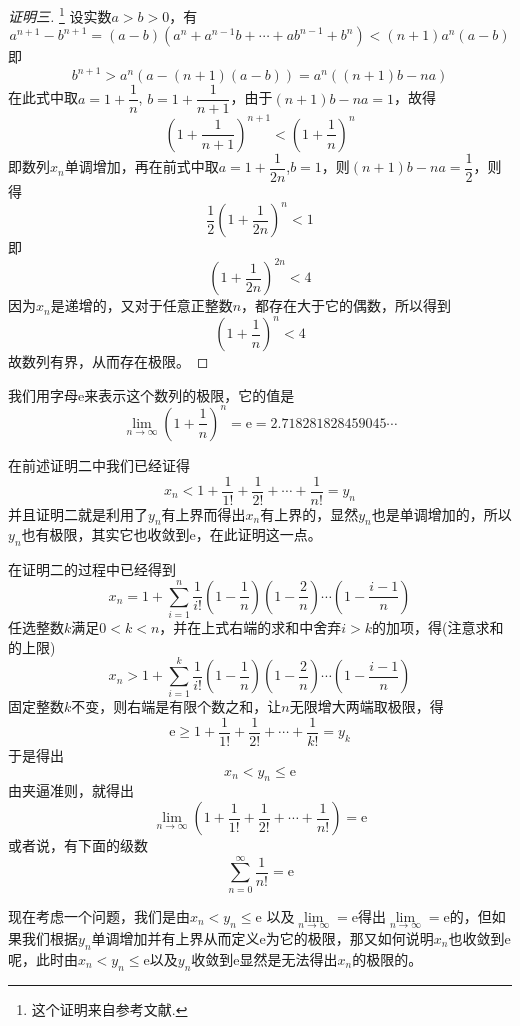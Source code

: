 \begin{proof}[证明三]\footnote{这个证明来自参考文献\cite{math-analysis}.}
  设实数$a>b>0$，有
  \[ a^{n+1}-b^{n+1}=(a-b)(a^n+a^{n-1}b+\cdots+ab^{n-1}+b^n) < (n+1)a^n(a-b) \]
  即
  \begin{equation}
    \label{eq:example-equation-a-n-b-n}
   b^{n+1}>a^n(a-(n+1)(a-b))=a^n((n+1)b-na) 
  \end{equation}
  在此式中取$a=1+\dfrac{1}{n}$, $b=1+\dfrac{1}{n+1}$，由于$(n+1)b-na=1$，故得
  \[ \left( 1+\frac{1}{n+1} \right)^{n+1} < \left( 1+\frac{1}{n} \right)^n \]
  即数列$x_n$单调增加，再在前式中取$a=1+\dfrac{1}{2n}$,$b=1$，则$(n+1)b-na=\dfrac{1}{2}$，则得
  \[ \frac{1}{2} \left( 1 + \frac{1}{2n} \right)^n < 1 \]
  即
  \[ \left( 1 + \frac{1}{2n} \right)^{2n} < 4 \]
  因为$x_n$是递增的，又对于任意正整数$n$，都存在大于它的偶数，所以得到
  \[ \left( 1 + \frac{1}{n} \right)^n < 4 \]
  故数列有界，从而存在极限。
\end{proof}

我们用字母$\mathrm{e}$来表示这个数列的极限，它的值是
\[ \lim_{n \to \infty} \left( 1+\frac{1}{n} \right)^n = \mathrm{e}= 2.718281828459045\cdots \]

在前述证明二中我们已经证得
\[ x_n < 1 + \frac{1}{1!} + \frac{1}{2!} + \cdots + \frac{1}{n!} = y_n \]
并且证明二就是利用了$y_n$有上界而得出$x_n$有上界的，显然$y_n$也是单调增加的，所以$y_n$也有极限，其实它也收敛到$\mathrm{e}$，在此证明这一点。

在证明二的过程中已经得到
\[ x_n = 1 + \sum_{i=1}^n \frac{1}{i!}\left( 1-\frac{1}{n} \right) \left( 1-\frac{2}{n} \right) \cdots \left( 1-\frac{i-1}{n} \right) \]
任选整数$k$满足$0<k<n$，并在上式右端的求和中舍弃$i>k$的加项，得(注意求和的上限)
\[ x_n > 1 + \sum_{i=1}^k \frac{1}{i!}\left( 1-\frac{1}{n} \right) \left( 1-\frac{2}{n} \right) \cdots \left( 1-\frac{i-1}{n} \right) \]
固定整数$k$不变，则右端是有限个数之和，让$n$无限增大两端取极限，得
\[ \mathrm{e} \geqslant 1 + \frac{1}{1!} + \frac{1}{2!} + \cdots + \frac{1}{k!} = y_k \]
于是得出
\[ x_n < y_n \leqslant \mathrm{e} \]
由夹逼准则，就得出
\[ \lim_{n \to \infty} \left( 1 + \frac{1}{1!} + \frac{1}{2!} + \cdots + \frac{1}{n!} \right) = \mathrm{e} \]
或者说，有下面的级数
\[ \sum_{n=0}^{\infty} \frac{1}{n!} = \mathrm{e} \]

现在考虑一个问题，我们是由$x_n<y_n \leqslant \mathrm{e}$ 以及$\lim\limits_{n \to \infty} = \mathrm{e}$得出$\lim\limits_{n \to \infty}=\mathrm{e}$的，但如果我们根据$y_n$单调增加并有上界从而定义$\mathrm{e}$为它的极限，那又如何说明$x_n$也收敛到$\mathrm{e}$呢，此时由$x_n<y_n\leqslant \mathrm{e}$以及$y_n$收敛到$\mathrm{e}$显然是无法得出$x_n$的极限的。

